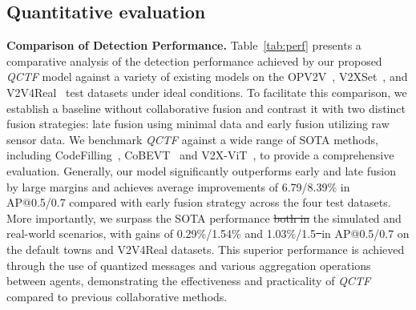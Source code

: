 \documentclass[lettersize,journal]{IEEEtran}
\makeatletter
\providecommand{\DIFadd}[1]{{\protect\color{blue}\uwave{#1}}} %
\providecommand{\DIFdel}[1]{{\protect\color{red}\sout{#1}}} %
\providecommand{\DIFaddbegin}{} %
\providecommand{\DIFaddend}{} %
\providecommand{\DIFdelbegin}{} %
\providecommand{\DIFdelend}{} %
\newcommand{\DIFscaledelfig}{0.5}
\newlength{\DIFdelgraphicswidth} %
\newlength{\DIFdelgraphicsheight} %
\newcommand{\DIFaddincludegraphics}[2][]{{\color{blue}\fbox{\DIFOincludegraphics[#1]{#2}}}} %
\newcommand{\DIFdelincludegraphics}[2][]{%
\sbox{\DIFdelgraphicsbox}{\DIFOincludegraphics[#1]{#2}}%
\settoboxwidth{\DIFdelgraphicswidth}{\DIFdelgraphicsbox} %
\settoboxtotalheight{\DIFdelgraphicsheight}{\DIFdelgraphicsbox} %
\scalebox{\DIFscaledelfig}{%
\parbox[b]{\DIFdelgraphicswidth}{\usebox{\DIFdelgraphicsbox}\\[-\baselineskip] \rule{\DIFdelgraphicswidth}{0em}}\llap{\resizebox{\DIFdelgraphicswidth}{\DIFdelgraphicsheight}{%
\setlength{\unitlength}{\DIFdelgraphicswidth}%
\begin{picture}(1,1)%
\thicklines\linethickness{2pt} %
{\color[rgb]{1,0,0}\put(0,0){\framebox(1,1){}}}%
{\color[rgb]{1,0,0}\put(0,0){\line( 1,1){1}}}%
{\color[rgb]{1,0,0}\put(0,1){\line(1,-1){1}}}%
\end{picture}%
}\hspace*{3pt}}} %
} %
\DeclareRobustCommand{\DIFaddbegin}{\DIFOaddbegin \let\includegraphics\DIFaddincludegraphics} %
\DeclareRobustCommand{\DIFaddend}{\DIFOaddend \let\includegraphics\DIFOincludegraphics} %
\DeclareRobustCommand{\DIFdelbegin}{\DIFOdelbegin \let\includegraphics\DIFdelincludegraphics} %
\DeclareRobustCommand{\DIFdelend}{\DIFOaddend \let\includegraphics\DIFOincludegraphics} %
\let\sout@orig\sout %
\renewcommand{\sout}[1]{\ifmmode\text{\sout@orig{\ensuremath{#1}}}\else\sout@orig{#1}\fi} %
\makeatother
\begin{document}
\subsection{Quantitative evaluation}

\noindent\textbf{Comparison of Detection Performance.}
Table~\ref{tab:perf} presents a comparative analysis of the detection performance achieved by our proposed \emph{QCTF} model against a variety of existing models on the OPV2V~\cite{opv2v}, V2XSet~\cite{v2x-vit}, and V2V4Real~\cite{v2v4} test datasets under ideal conditions. To facilitate this comparison, we establish a baseline without collaborative fusion and contrast it with two distinct fusion strategies: late fusion using minimal data and early fusion utilizing raw sensor data.
We benchmark \emph{QCTF} against a wide range of SOTA methods, including CodeFilling~\cite{codefilling}, CoBEVT~\cite{cobevt} and V2X-ViT~\cite{v2x-vit}, to provide a comprehensive evaluation. 
 Generally, our model significantly outperforms early and late fusion by large margins and achieves average improvements of 6.79\DIFaddbegin \DIFadd{$\%$}\DIFaddend /8.39$\%$ in AP@0.5/0.7 compared with early fusion strategy across the four test datasets.
 More importantly, we surpass the SOTA performance \DIFdelbegin \DIFdel{both in }\DIFdelend \DIFaddbegin \DIFadd{in both }\DIFaddend the simulated and real-world scenarios, with gains of 0.29\%/1.54\% and 1.03\%/1.5\DIFdelbegin \DIFdel{\ }\DIFdelend \DIFaddbegin \DIFadd{\% }\DIFaddend in AP@0.5/0.7 on the default towns and V2V4Real datasets. 
This superior performance is achieved through the use of quantized messages and various aggregation operations between agents, demonstrating the effectiveness and practicality of \emph{QCTF} compared to previous collaborative methods.
\end{document}
